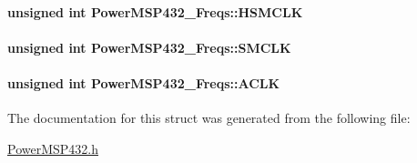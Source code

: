 \paragraph[{H\+S\+M\+C\+L\+K}]{\setlength{\rightskip}{0pt plus 5cm}unsigned int Power\+M\+S\+P432\+\_\+\+Freqs\+::\+H\+S\+M\+C\+L\+K}\label{struct_power_m_s_p432___freqs_ae390f1cabbfb7383e55655457d6ac74a}
\paragraph[{S\+M\+C\+L\+K}]{\setlength{\rightskip}{0pt plus 5cm}unsigned int Power\+M\+S\+P432\+\_\+\+Freqs\+::\+S\+M\+C\+L\+K}\label{struct_power_m_s_p432___freqs_aacb0ccad74d7029f8678b1b61fa682ed}
\paragraph[{A\+C\+L\+K}]{\setlength{\rightskip}{0pt plus 5cm}unsigned int Power\+M\+S\+P432\+\_\+\+Freqs\+::\+A\+C\+L\+K}\label{struct_power_m_s_p432___freqs_acb3ced6dd64c0010d6745cd11ae6d166}


The documentation for this struct was generated from the following file\+:\begin{DoxyCompactItemize}
\item 
\hyperlink{_power_m_s_p432_8h}{Power\+M\+S\+P432.\+h}\end{DoxyCompactItemize}
